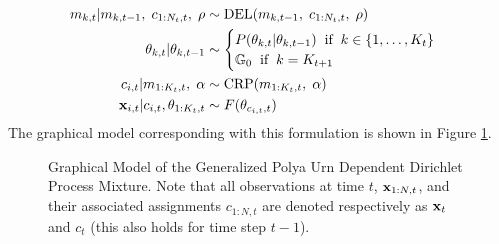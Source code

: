 \documentclass[smallcondensed, final]{svjour3}
\begin{document}
\begin{align}
\begin{split}
m_{k,t} | m_{k,t-1}, \hspace{1mm} c_{1:N_{t}, t}, \hspace{1mm} \rho  &\sim \text{DEL}(m_{k,t-1}, \hspace{1mm} c_{1:N_{t}, t}, \hspace{1mm} \rho) \\
\theta_{k, t} | \theta_{k, t-1}   &\sim
\begin{cases}
	P(\theta_{k, t} | \theta_{k, t-1}) \hspace{2mm} \text{if} \hspace{2mm} k \in \{ 1, \ldots, K_{t} \} \\
	\mathbb{G}_{0}   \hspace{2mm} \text{if} \hspace{2mm} k = K_{t+1}
\end{cases} \\
c_{i,t} | m_{1:K_{t},t}, \hspace{1mm} \alpha  &\sim  \text{CRP} (m_{1:K_{t},t}, \hspace{1mm} \alpha) \\
\bold{x}_{i,t} | c_{i,t}, \theta_{1:K_{t}, t} &\sim F(\theta_{c_{i,t}, t})
\end{split}
\end{align}
The graphical model corresponding with this formulation is shown in Figure \ref{fig:gpuddpm_gm_1}.
\begin{figure}[h]
        \caption{\label{fig:gpuddpm_gm_1} Graphical Model of the Generalized Polya Urn Dependent Dirichlet Process Mixture. Note that all observations at time $t$, $\bold{x}_{1:N,t}$, and their associated assignments $c_{1:N,t}$ are denoted respectively as $\bold{x}_{t}$ and $c_{t}$ (this also holds for time step $t-1$).}
\end{figure}
\end{document}
